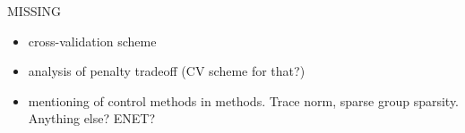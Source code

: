 \documentclass{article} %
\begin{document}
{\color{red}
MISSING
\begin{itemize}
\item cross-validation scheme
\item analysis of penalty tradeoff (CV scheme for that?)
\item mentioning of control methods in methods. Trace norm, sparse group sparsity. Anything else? ENET?
\end{itemize}
}

\end{document}
